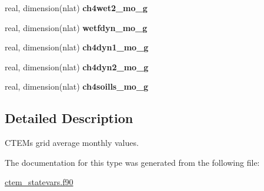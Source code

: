 \begin{DoxyCompactItemize}
\item 
\hypertarget{structctem__statevars_1_1ctem__gridavg__monthly_ae7a971870a3e51a207f9f2b8b42d67bd}{}real, dimension(nlat) {\bfseries ch4wet2\+\_\+mo\+\_\+g}\label{structctem__statevars_1_1ctem__gridavg__monthly_ae7a971870a3e51a207f9f2b8b42d67bd}

\item 
\hypertarget{structctem__statevars_1_1ctem__gridavg__monthly_a037e547947b601c4de702decc911c83f}{}real, dimension(nlat) {\bfseries wetfdyn\+\_\+mo\+\_\+g}\label{structctem__statevars_1_1ctem__gridavg__monthly_a037e547947b601c4de702decc911c83f}

\item 
\hypertarget{structctem__statevars_1_1ctem__gridavg__monthly_afe4823e11b8fc7e7941157b5fb07ab7e}{}real, dimension(nlat) {\bfseries ch4dyn1\+\_\+mo\+\_\+g}\label{structctem__statevars_1_1ctem__gridavg__monthly_afe4823e11b8fc7e7941157b5fb07ab7e}

\item 
\hypertarget{structctem__statevars_1_1ctem__gridavg__monthly_abf293b9b1d757173a4498d172fbd1ca8}{}real, dimension(nlat) {\bfseries ch4dyn2\+\_\+mo\+\_\+g}\label{structctem__statevars_1_1ctem__gridavg__monthly_abf293b9b1d757173a4498d172fbd1ca8}

\item 
\hypertarget{structctem__statevars_1_1ctem__gridavg__monthly_a326b3465ef928e447d1772f598fd41d2}{}real, dimension(nlat) {\bfseries ch4soills\+\_\+mo\+\_\+g}\label{structctem__statevars_1_1ctem__gridavg__monthly_a326b3465ef928e447d1772f598fd41d2}

\end{DoxyCompactItemize}


\subsection{Detailed Description}
C\+T\+E\+M\textquotesingle{}s grid average monthly values. 

The documentation for this type was generated from the following file\+:\begin{DoxyCompactItemize}
\item 
\hyperlink{ctem__statevars_8f90}{ctem\+\_\+statevars.\+f90}\end{DoxyCompactItemize}
